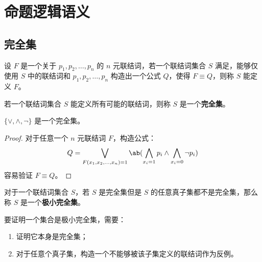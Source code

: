 \section{命题逻辑语义}

\subsection{完全集}

\begin{definition}
    设 $F$ 是一个关于 $p_1, p_2, \dots, p_n$ 的 $n$ 元联结词，若一个联结词集合 $S$ 满足，能够仅使用 $S$ 中的联结词和 $p_1, p_2, \dots, p_n$ 构造出一个公式 $Q$，使得 $F \equiv Q$，则称 $S$ 能定义 $F$。
\end{definition}

\begin{definition}[完全集]
    若一个联结词集合 $S$ 能定义所有可能的联结词，则称 $S$ 是一个\textbf{完全集}。
\end{definition}

\begin{theorem}
    $\{\lor, \land, \lnot\}$ 是一个完全集。
    \begin{proof}
        对于任意一个 $n$ 元联结词 $F$，构造公式：
        $$
        Q = \bigvee_{F(x_1, x_2, \dots, x_n) = 1} \ab(\bigwedge_{x_i = 1} p_i \land \bigwedge_{x_i = 0} \lnot p_i)
        $$
        容易验证 $F \equiv Q$。
    \end{proof}
\end{theorem}

\begin{definition}[极小完全集]
    对于一个联结词集合 $S$，若 $S$ 是完全集但是 $S$ 的任意真子集都不是完全集，那么称 $S$ 是一个\textbf{极小完全集}。
\end{definition}

要证明一个集合是极小完全集，需要：
\begin{enumerate}
    \item 证明它本身是完全集；
    \item 对于任意个真子集，构造一个不能够被该子集定义的联结词作为反例。
\end{enumerate}
